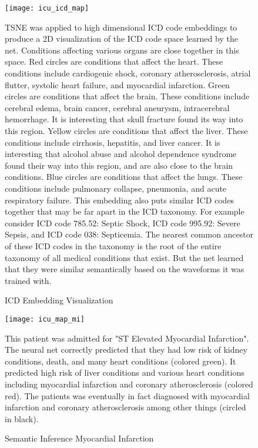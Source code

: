 \begin{figure}
\texttt{[image: icu\_icd\_map]}
\caption{ICD Embedding Visualization}
\vspace{12px}
TSNE was applied to high dimensional ICD code embeddings to produce a 2D visualization of the ICD code space learned by the net.  Conditions affecting various organs are close together in this space.  Red circles are conditions that affect the heart.  These conditions include cardiogenic shock, coronary atherosclerosis, atrial flutter, systolic heart failure, and myocardial infarction.  Green circles are conditions that affect the brain.  These conditions include cerebral edema, brain cancer, cerebral aneurysm, intracerebral hemorrhage.  It is interesting that skull fracture found its way into this region.  Yellow circles are conditions that affect the liver.  These conditions include cirrhosis, hepatitis, and liver cancer.  It is interesting that alcohol abuse and alcohol dependence syndrome found their way into this region, and are also close to the brain conditions.  Blue circles are conditions that affect the lungs.  These conditions include pulmonary collapse, pneumonia, and acute respiratory failure.  This embedding also puts similar ICD codes together that may be far apart in the ICD taxonomy.  For example consider ICD code 785.52: Septic Shock, ICD code 995.92: Severe Sepsis, and ICD code 038: Septicemia.  The nearest common ancestor of these ICD codes in the taxonomy is the root of the entire taxonomy of all medical conditions that exist.  But the net learned that they were similar semantically based on the waveforms it was trained with.
\label{fig:icu_icd_map}
\end{figure}
    
\begin{figure}
\texttt{[image: icu\_map\_mi]}
\caption{Semantic Inference Myocardial Infarction}
\vspace{12px}
This patient was admitted for "ST Elevated Myocardial Infarction".  The neural net correctly predicted that they had low risk of kidney conditions, death, and many heart conditions (colored green).  It predicted high risk of liver conditions and various heart conditions including myocardial infarction and coronary atherosclerosis (colored red).  The patients was eventually in fact diagnosed with myocardial infarction and coronary atherosclerosis among other things (circled in black).
\label{fig:icu_map_mi}
\end{figure}

